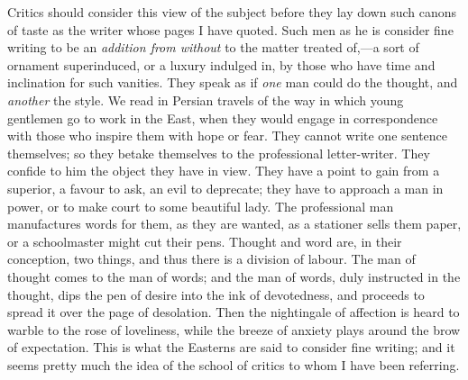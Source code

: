 Critics should consider this view of the subject before they lay
down such canons of taste as the writer whose pages I have quoted.
Such men as he is consider fine writing to be an \emph{addition from
without} to the matter treated of,—a sort of ornament
superinduced, or a luxury indulged in, by those who have time and
inclination for such vanities. They speak as if \emph{one} man could
do the thought, and \emph{another} the style. We read in Persian
travels of the way in which young gentlemen go to work in the East,
when they would engage in correspondence with those who inspire them
with hope or fear. They cannot write one sentence themselves; so they
betake themselves to the professional letter-writer. They confide to
him the object they have in view. They have a point to gain from a
superior, a favour to ask, an evil to deprecate; they have to approach
a man in power, or to make court to some beautiful lady. The
professional man manufactures words for them, as they are wanted, as a
stationer sells them paper, or a schoolmaster might cut their pens.
Thought and word are, in their conception, two things, and thus there
is a division of labour. The man of thought comes to the man of words;
and the man of words, duly instructed in the thought, dips the pen of
desire into the ink of devotedness, and proceeds to spread it
over the page of desolation. Then the nightingale of affection is
heard to warble to the rose of loveliness, while the breeze of anxiety
plays around the brow of expectation. This is what the Easterns are
said to consider fine writing; and it seems pretty much the idea of
the school of critics to whom I have been referring.


